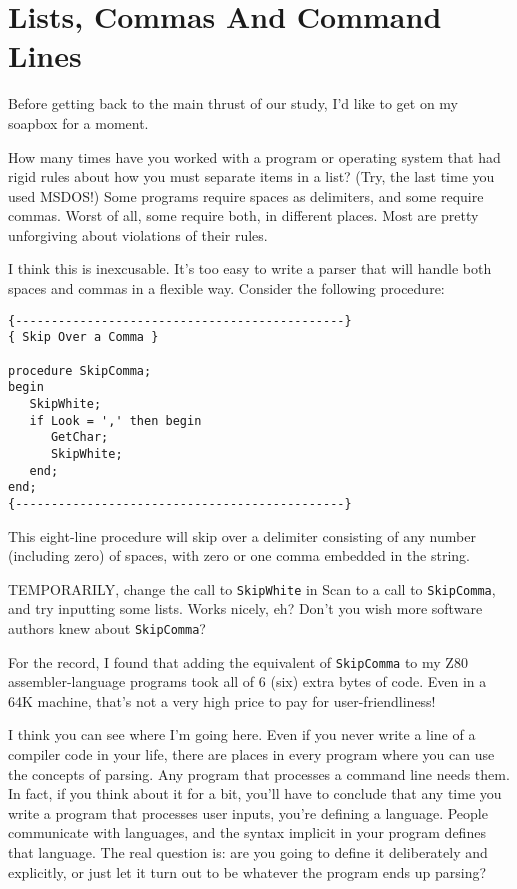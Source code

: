 \section{Lists, Commas And Command Lines}

Before getting back to the main thrust of our study, I'd  like to get on my soapbox for a moment.

How many times have you worked with a program or operating system that had rigid rules about how you must separate items in a list?  (Try, the  last  time  you  used MSDOS!)  Some programs  require spaces as delimiters, and  some  require  commas. Worst of all, some  require  both, in  different  places. Most  are  pretty unforgiving about violations of their rules.

I think this is inexcusable. It's too  easy  to  write  a parser that will handle  both  spaces  and  commas  in  a  flexible way. Consider the following procedure:

\begin{verbatim}
{----------------------------------------------}
{ Skip Over a Comma }

procedure SkipComma;
begin
   SkipWhite;
   if Look = ',' then begin
      GetChar;
      SkipWhite;
   end;
end;
{----------------------------------------------}
\end{verbatim}

This eight-line procedure will skip over  a  delimiter consisting of any number (including zero)  of spaces, with zero or one comma embedded in the string.

TEMPORARILY, change the call to {\tt SkipWhite} in Scan to  a  call  to {\tt SkipComma}, and  try  inputting some lists. Works  nicely, eh?  Don't you wish more software authors knew about {\tt SkipComma}?

For the record, I found that adding the  equivalent  of {\tt SkipComma} to my Z80 assembler-language programs took all of  6  (six) extra bytes of  code. Even  in a 64K machine, that's not a very high price to pay for user-friendliness!

I  think  you can see where I'm going here. Even  if  you  never write a line of a compiler code in your life, there are places in every program where  you  can  use  the concepts of parsing. Any program that processes a command line needs them. In  fact, if you  think  about  it for a bit, you'll have to conclude that any time  you  write  a program that processes  user  inputs, you're defining a  language. People communicate with languages, and the syntax implicit in your program  defines that language. The real question  is:  are  you  going  to  define  it  deliberately  and explicitly, or just let it turn out to be  whatever  the  program ends up parsing?


